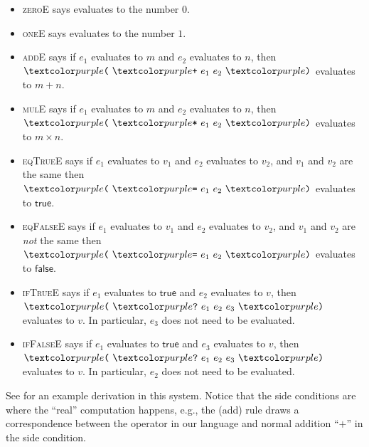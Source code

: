 \begin{itemize}
\item \textsc{zeroE} says  evaluates to the number $0$.
\item \textsc{oneE} says  evaluates to the number $1$.
\item \textsc{addE} says if $e_1$ evaluates to $m$ and $e_2$ evaluates to $n$, then $\codel( \ \codel+ \ e_1 \ e_2 \ \codel)$ evaluates to $m + n$.
\item \textsc{mulE} says if $e_1$ evaluates to $m$ and $e_2$ evaluates to $n$, then $\codel( \ \codel* \ e_1 \ e_2 \ \codel)$ evaluates to $m \times n$.
\item \textsc{eqTrueE} says if $e_1$ evaluates to $v_1$ and $e_2$ evaluates to $v_2$, and $v_1$ and $v_2$ are the same then $\codel( \ \codel= \ e_1 \ e_2 \ \codel)$ evaluates to $\mathsf{true}$.
\item \textsc{eqFalseE} says if $e_1$ evaluates to $v_1$ and $e_2$ evaluates to $v_2$, and $v_1$ and $v_2$ are \textit{not} the same then $\codel( \ \codel= \ e_1 \ e_2 \ \codel)$ evaluates to $\mathsf{false}$.
\item \textsc{ifTrueE} says if $e_1$ evaluates to $\mathsf{true}$ and $e_2$ evaluates to $v$, then $\codel( \ \codel? \ e_1 \ e_2 \ e_3 \ \codel)$ evaluates to $v$.
  In particular, $e_3$ does not need to be evaluated.
\item \textsc{ifFalseE} says if $e_1$ evaluates to $\mathsf{true}$ and $e_3$ evaluates to $v$, then $\codel( \ \codel? \ e_1 \ e_2 \ e_3 \ \codel)$ evaluates to $v$.
  In particular, $e_2$ does not need to be evaluated.
\end{itemize}
See  for an example derivation in this system.
Notice that the side conditions are where the \enquote{real} computation happens, e.g., the (add) rule draws a correspondence between the \codel{+} operator in our language and normal addition \enquote{$+$} in the side condition.

